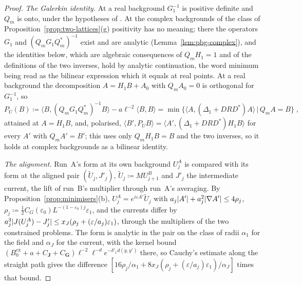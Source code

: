 \documentclass[11pt]{preprint}
\DeclarePairedDelimiter{\abs}{\lvert}{\rvert}
\numberwithin{equation}{section}
\theoremstyle{definition}
\theoremstyle{remark}
\theoremstyle{plain}
\begin{document}
\begin{proof}
\emph{The Galerkin identity.} At a real background $G_1^{-1}$ is positive definite and $Q_m$ is onto, under the hypotheses of \cite[Theorem~3.12, p.~423]{BalabanPBG}. At the complex backgrounds of the class of Proposition~\ref{prop:two-lattices}(g) positivity has no meaning; there the operators $G_1$ and $(Q_mG_1Q_m^*)^{-1}$ exist and are analytic (Lemma~\ref{lem:pbg-complex}), and the identities below, which are algebraic consequences of $Q_mH_1 = 1$ and of the definitions of the two inverses, hold by analytic continuation, the word minimum being read as the bilinear expression which it equals at real points. At a real background the decomposition $A = H_1B + A_0$ with $Q_mA_0 = 0$ is orthogonal for $G_1^{-1}$, so
\begin{equation}\label{eq:galerkin-penalty}
    P_U(B) \coloneqq \langle B, (Q_mG_1Q_m^*)^{-1}B\rangle - a\ell^{-2}\langle B, B\rangle = \min\{\langle A, (\Delta_1 + DRD^*)A\rangle \, | \, Q_mA = B\}\;,
\end{equation}
attained at $A = H_1B$, and, polarised, $\langle B', P_UB\rangle = \langle A', (\Delta_1 + DRD^*)H_1B\rangle$ for every $A'$ with $Q_mA' = B'$; this uses only $Q_mH_1B = B$ and the two inverses, so it holds at complex backgrounds as a bilinear identity.

\emph{The alignment.} Run~A's form at its own background $U^A_j$ is compared with its form at the aligned pair $(\tilde U_j, J'_j)$, $\tilde U_j \coloneqq MU^B_{j+1}$ and $J'_j$ the intermediate current, the lift of run~B's multiplier through run~A's averaging. By Proposition~\ref{prop:minimisers}(b), $U^A_j = e^{i\varepsilon A'}\tilde U_j$ with $a_j\abs{A'} + a_j^2\abs{\nabla A'} \leq 4\rho_j$, $\rho_j \coloneqq \frac12C_G(\varepsilon_0)L^{-(1-\varepsilon_0)j}\varepsilon_1$, and the currents differ by $a_j^3\abs{J(U^A_j) - J'_j} \leq x_J(\rho_j + (\varepsilon/a_j)\varepsilon_1)$, through the multipliers of the two constrained problems. The form is analytic in the pair on the class of radii $\alpha_1$ for the field and $\alpha_J$ for the current, with the kernel bound $(B^{\mathrm{cx}}_0 + a + C_{\mathbf J} + C_{\mathbf G})\ell^{-2}\ell^{-d}e^{-\delta'_1d(y,y')}$ there, so Cauchy's estimate along the straight path gives the difference $[16\rho_j/\alpha_1 + 8x_J(\rho_j + (\varepsilon/a_j)\varepsilon_1)/\alpha_J]$ times that bound.


\end{proof}
\end{document}
